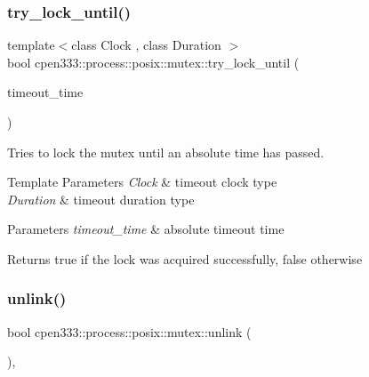 \subsubsection{\texorpdfstring{try\+\_\+lock\+\_\+until()}{try\_lock\_until()}}
{\footnotesize\ttfamily template$<$class Clock , class Duration $>$ \\
bool cpen333\+::process\+::posix\+::mutex\+::try\+\_\+lock\+\_\+until (\begin{DoxyParamCaption}\item[{const std\+::chrono\+::time\+\_\+point$<$ Clock, Duration $>$ \&}]{timeout\+\_\+time }\end{DoxyParamCaption})\hspace{0.3cm}{\ttfamily [inline]}}



Tries to lock the mutex until an absolute time has passed. 


\begin{DoxyTemplParams}{Template Parameters}
{\em Clock} & timeout clock type \\
\hline
{\em Duration} & timeout duration type \\
\hline
\end{DoxyTemplParams}

\begin{DoxyParams}{Parameters}
{\em timeout\+\_\+time} & absolute timeout time \\
\hline
\end{DoxyParams}
\begin{DoxyReturn}{Returns}
true if the lock was acquired successfully, false otherwise 
\end{DoxyReturn}
\mbox{\label{classcpen333_1_1process_1_1posix_1_1mutex_ac1bcf9576d7470e5d64e17876c9cdb36}} 
\subsubsection{\texorpdfstring{unlink()}{unlink()}\hspace{0.1cm}{\footnotesize\ttfamily [1/2]}}
{\footnotesize\ttfamily bool cpen333\+::process\+::posix\+::mutex\+::unlink (\begin{DoxyParamCaption}{ }\end{DoxyParamCaption})\hspace{0.3cm}{\ttfamily [inline]}, {\ttfamily [virtual]}}



